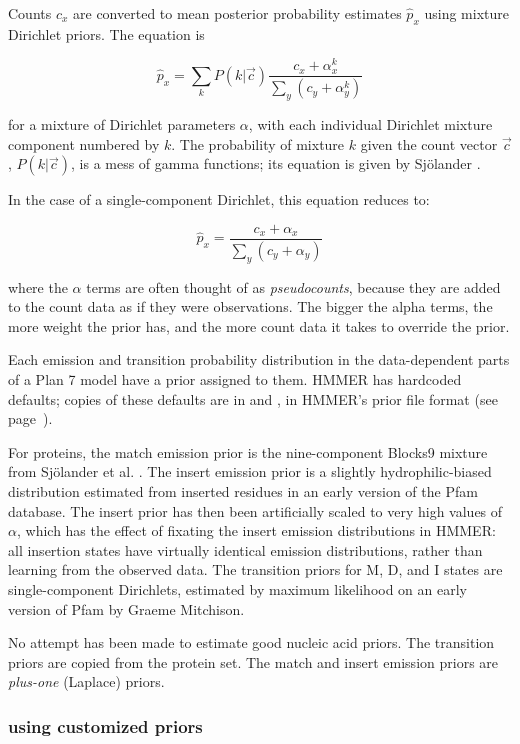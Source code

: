 Counts $c_x$ are converted to mean posterior probability estimates
$\hat{p}_x$ using mixture Dirichlet priors.  The equation is

\[
  \hat{p}_x = \sum_k P(k | \vec{c})
  \frac{c_x + \alpha_x^k}{\sum_{y} (c_y + \alpha_{y}^k) }
\]

for a mixture of Dirichlet parameters $\alpha$, with each individual
Dirichlet mixture component numbered by $k$. The probability of
mixture $k$ given the count vector $\vec{c}$, $P(k | \vec{c})$, is a
mess of gamma functions; its equation is given by Sj\"{o}lander
\citep{Sjolander96,Durbin98}.

In the case of a single-component Dirichlet, this equation reduces to:

\[ 
  \hat{p}_x = \frac{c_x + \alpha_x}{\sum_{y} (c_y + \alpha_{y}) }
\]

where the $\alpha$ terms are often thought of as \emph{pseudocounts},
because they are added to the count data as if they were observations.
The bigger the alpha terms, the more weight the prior has, and the
more count data it takes to override the prior.

Each emission and transition probability distribution in the
data-dependent parts of a Plan 7 model have a prior assigned to them.
HMMER has hardcoded defaults; copies of these defaults are in
 and , in HMMER's
prior file format (see page~\pageref{section:priorfiles}).

For proteins, the match emission prior is the nine-component Blocks9
mixture from Sj\"{o}lander et al. \citep{Sjolander96}. The insert
emission prior is a slightly hydrophilic-biased distribution estimated
from inserted residues in an early version of the Pfam database. The
insert prior has then been artificially scaled to very high values of
$\alpha$, which has the effect of fixating the insert emission
distributions in HMMER: all insertion states have virtually identical
emission distributions, rather than learning from the observed data.
The transition priors for M, D, and I states are single-component
Dirichlets, estimated by maximum likelihood on an early version of
Pfam by Graeme Mitchison.

No attempt has been made to estimate good nucleic acid priors.  The
transition priors are copied from the protein set. The match and
insert emission priors are \emph{plus-one} (Laplace) priors.

\subsubsection{using customized priors}

